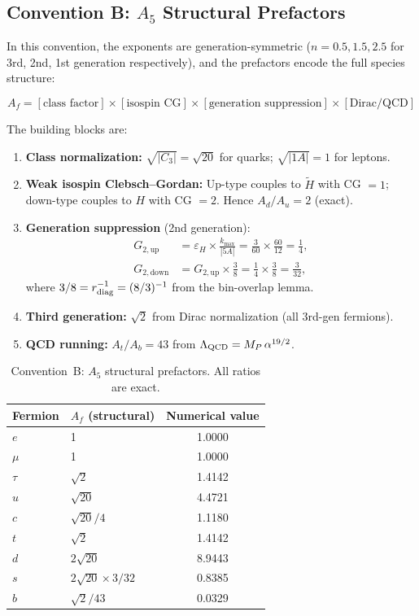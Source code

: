 \documentclass[11pt,a4paper]{article}
\theoremstyle{definition}
\theoremstyle{remark}
\begin{document}
\subsection{Convention B: $A_5$ Structural Prefactors}

In this convention, the exponents are generation-symmetric
($n = 0.5, 1.5, 2.5$ for 3rd, 2nd, 1st generation respectively),
and the prefactors encode the full species structure:

\begin{equation}
A_f = [\text{class factor}] \times [\text{isospin CG}] \times [\text{generation suppression}] \times [\text{Dirac/QCD}]
\end{equation}

The building blocks are:
\begin{enumerate}
\item \textbf{Class normalization:}
  $\sqrt{|C_3|} = \sqrt{20}$ for quarks; $\sqrt{|1A|} = 1$ for leptons.

\item \textbf{Weak isospin Clebsch--Gordan:}
  Up-type couples to $\tilde{H}$ with CG $= 1$;
  down-type couples to $H$ with CG $= 2$.
  Hence $A_d/A_u = 2$ (exact).

\item \textbf{Generation suppression} (2nd generation):
  \begin{align}
  G_{2,\text{up}} &= \varepsilon_H \times \frac{k_{\max}}{|5A|} = \frac{3}{60}\times\frac{60}{12} = \frac{1}{4}, \\
  G_{2,\text{down}} &= G_{2,\text{up}} \times \frac{3}{8} = \frac{1}{4}\times\frac{3}{8} = \frac{3}{32},
  \end{align}
  where $3/8 = r_{\rm diag}^{-1} = (8/3)^{-1}$ from the bin-overlap lemma.

\item \textbf{Third generation:}  $\sqrt{2}$ from Dirac normalization (all 3rd-gen fermions).

\item \textbf{QCD running:}  $A_t/A_b = 43$ from $\Lambda_{\rm QCD} = M_P\,\alpha^{19/2}$.
\end{enumerate}

\begin{table}[h]
\centering
\begin{tabular}{llc}
\toprule
Fermion & $A_f$ (structural) & Numerical value \\
\midrule
$e$ & 1 & 1.0000 \\
$\mu$ & 1 & 1.0000 \\
$\tau$ & $\sqrt{2}$ & 1.4142 \\
$u$ & $\sqrt{20}$ & 4.4721 \\
$c$ & $\sqrt{20}/4$ & 1.1180 \\
$t$ & $\sqrt{2}$ & 1.4142 \\
$d$ & $2\sqrt{20}$ & 8.9443 \\
$s$ & $2\sqrt{20}\times 3/32$ & 0.8385 \\
$b$ & $\sqrt{2}/43$ & 0.0329 \\
\bottomrule
\end{tabular}
\caption{Convention~B: $A_5$ structural prefactors.  All ratios are exact.}
\label{tab:Af_structural}
\end{table}
\end{document}

